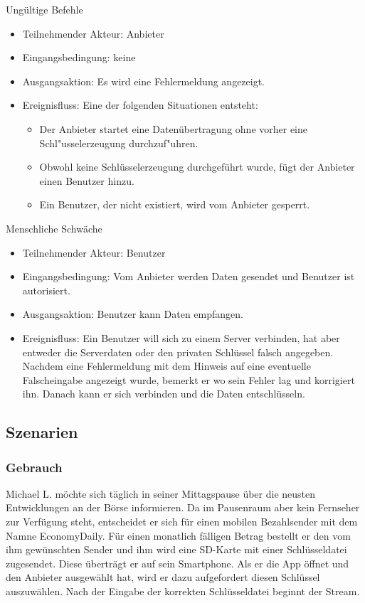 \documentclass[a4paper,10pt]{scrartcl}
\begin{document}
\begin{usecase}
 {Ungültige Befehle
   \begin{itemize}
   \item Teilnehmender Akteur: Anbieter
   \item Eingangsbedingung: keine
   \item Ausgangsaktion: Es wird eine Fehlermeldung angezeigt.
   \item Ereignisfluss:
          Eine der folgenden Situationen entsteht:
          \begin{itemize}
           \item Der Anbieter startet eine Datenübertragung ohne vorher eine Schl"usselerzeugung
                 durchzuf"uhren.
           \item Obwohl keine Schlüsselerzeugung durchgeführt wurde, fügt der Anbieter einen Benutzer hinzu.
           \item Ein Benutzer, der nicht existiert, wird vom Anbieter gesperrt.
           \end{itemize}
   \end{itemize}
}
 {Menschliche Schwäche
   \begin{itemize}
   \item Teilnehmender Akteur: Benutzer
   \item Eingangsbedingung: Vom Anbieter werden Daten gesendet und Benutzer ist autorisiert.
   \item Ausgangsaktion: Benutzer kann Daten empfangen.
   \item Ereignisfluss: Ein Benutzer will sich zu einem Server verbinden, hat aber entweder
             die Serverdaten oder den privaten Schlüssel falsch angegeben. Nachdem eine
             Fehlermeldung mit dem Hinweis auf eine eventuelle Falscheingabe angezeigt wurde,
             bemerkt er wo sein Fehler lag und korrigiert ihn. Danach kann er sich verbinden
             und die Daten entschlüsseln.
   \end{itemize}
}
\end{usecase}

\clearpage
\subsection{Szenarien}

\subsubsection{Gebrauch}
Michael L. möchte sich täglich in seiner Mittagspause über die neusten Entwicklungen an der Börse informieren. 
Da im Pausenraum aber kein Fernseher zur Verfügung steht, entscheidet er sich für einen mobilen Bezahlsender mit dem Namne EconomyDaily. 
Für einen monatlich fälligen Betrag bestellt er den vom ihm gewünschten Sender und ihm wird eine SD-Karte mit einer Schlüsseldatei zugesendet. 
Diese überträgt er auf sein Smartphone. Als er die App öffnet und den Anbieter ausgewählt hat, wird er dazu aufgefordert diesen Schlüssel auszuwählen. 
Nach der Eingabe der korrekten Schlüsseldatei beginnt der Stream. 
\end{document}
